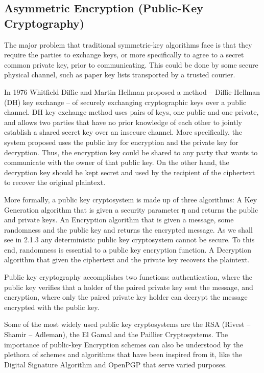 \subsection{Asymmetric Encryption (Public-Key Cryptography)}
The major problem that traditional symmetric-key algorithms face is that they require the parties to exchange keys, or more specifically to agree to a secret common private key, prior to communicating.
This could be done by some secure physical channel, such as paper key lists transported by a trusted courier.

In 1976 Whitfield Diffie and Martin Hellman proposed a method – Diffie-Hellman (DH) key exchange – of securely exchanging cryptographic keys over a public channel.
DH key exchange method uses pairs of keys, one public and one private, and allows two parties that have no prior knowledge of each other to jointly establish a shared secret key over an insecure channel. More specifically, the system proposed uses the public key for encryption and the private key for decryption.
Thus, the encryption key could be shared to any party that wants to communicate with the owner of that public key.
On the other hand, the decryption key should be kept secret and used by the recipient of the ciphertext to recover the original plaintext.

More formally, a public key cryptosystem is made up of three algorithms:
A Key Generation algorithm that is given a security parameter η and returns the public and private keys.
An Encryption algorithm that is given a message, some randomness and the public key and returns the encrypted message.
As we shall see in 2.1.3 any deterministic public key cryptosystem cannot be secure. To this end, randomness is essential to a public key encryption function.
A Decryption algorithm that given the ciphertext and the private key recovers the plaintext.

Public key cryptography accomplishes two functions: authentication, where the public key verifies that a holder of the paired private key sent the message, and encryption, where only the paired private key holder can decrypt the message encrypted with the public key.

Some of the most widely used public key cryptosystems are the RSA (Rivest – Shamir – Adleman), the El Gamal and the Paillier Cryptosystems.
The importance of public-key Encryption schemes can also be understood by the plethora of schemes and algorithms that have been inspired from it, like the Digital Signature Algorithm and OpenPGP that serve varied purposes.
